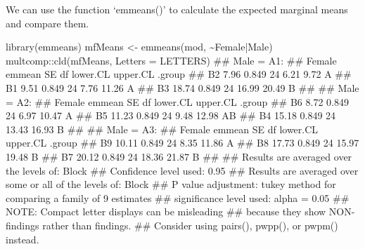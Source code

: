 \documentclass[a4paper,12pt,oneside]{book}
\newenvironment{Shaded}{\begin{snugshade}}{\end{snugshade}}
\newcommand{\SpecialCharTok}[1]{#1}
\newcommand{\DocumentationTok}[1]{#1}
\newcommand{\OtherTok}[1]{#1}
\newcommand{\FunctionTok}[1]{#1}
\newcommand{\AttributeTok}[1]{#1}
\newcommand{\AlertTok}[1]{#1}
\newcommand{\NormalTok}[1]{#1}
\begin{document}
We can use the function `emmeans()' to calculate the expected marginal means and compare them.

\vspace{12pt}

\begin{Shaded}
\begin{Highlighting}[]
\FunctionTok{library}\NormalTok{(emmeans)}
\NormalTok{mfMeans }\OtherTok{\textless{}{-}} \FunctionTok{emmeans}\NormalTok{(mod, }\SpecialCharTok{\textasciitilde{}}\NormalTok{Female}\SpecialCharTok{|}\NormalTok{Male)}
\NormalTok{multcomp}\SpecialCharTok{::}\FunctionTok{cld}\NormalTok{(mfMeans, }\AttributeTok{Letters =}\NormalTok{ LETTERS)}
\DocumentationTok{\#\# Male = A1:}
\DocumentationTok{\#\#  Female emmean    SE df lower.CL upper.CL .group}
\DocumentationTok{\#\#  B2       7.96 0.849 24     6.21     9.72  A    }
\DocumentationTok{\#\#  B1       9.51 0.849 24     7.76    11.26  A    }
\DocumentationTok{\#\#  B3      18.74 0.849 24    16.99    20.49   B   }
\DocumentationTok{\#\# }
\DocumentationTok{\#\# Male = A2:}
\DocumentationTok{\#\#  Female emmean    SE df lower.CL upper.CL .group}
\DocumentationTok{\#\#  B6       8.72 0.849 24     6.97    10.47  A    }
\DocumentationTok{\#\#  B5      11.23 0.849 24     9.48    12.98  AB   }
\DocumentationTok{\#\#  B4      15.18 0.849 24    13.43    16.93   B   }
\DocumentationTok{\#\# }
\DocumentationTok{\#\# Male = A3:}
\DocumentationTok{\#\#  Female emmean    SE df lower.CL upper.CL .group}
\DocumentationTok{\#\#  B9      10.11 0.849 24     8.35    11.86  A    }
\DocumentationTok{\#\#  B8      17.73 0.849 24    15.97    19.48   B   }
\DocumentationTok{\#\#  B7      20.12 0.849 24    18.36    21.87   B   }
\DocumentationTok{\#\# }
\DocumentationTok{\#\# Results are averaged over the levels of: Block }
\DocumentationTok{\#\# Confidence level used: 0.95 }
\DocumentationTok{\#\# Results are averaged over some or all of the levels of: Block }
\DocumentationTok{\#\# P value adjustment: tukey method for comparing a family of 9 estimates }
\DocumentationTok{\#\# significance level used: alpha = 0.05 }
\DocumentationTok{\#\# }\AlertTok{NOTE}\DocumentationTok{: Compact letter displays can be misleading}
\DocumentationTok{\#\#       because they show NON{-}findings rather than findings.}
\DocumentationTok{\#\#       Consider using \textquotesingle{}pairs()\textquotesingle{}, \textquotesingle{}pwpp()\textquotesingle{}, or \textquotesingle{}pwpm()\textquotesingle{} instead.}
\end{Highlighting}
\end{Shaded}
\end{document}
